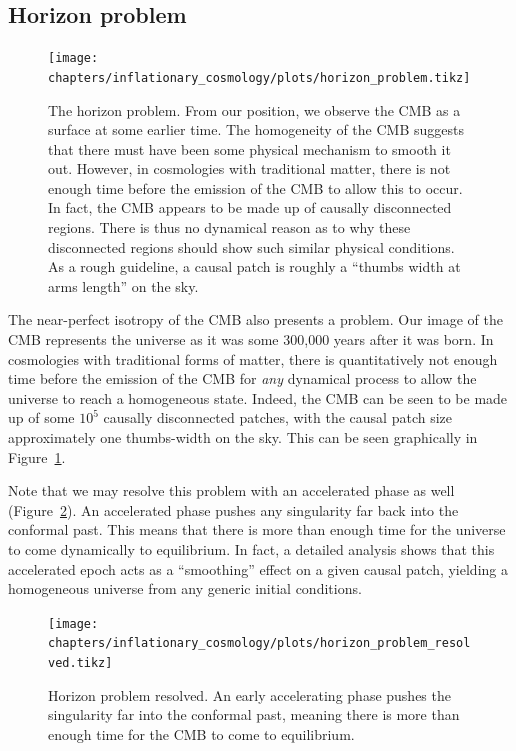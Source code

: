 \subsection{Horizon problem}
\begin{figure}[tp]
  \centering
  \texttt{[image: chapters/inflationary\_cosmology/plots/horizon\_problem.tikz]}
  \caption{The horizon problem. From our position, we observe the CMB as a surface at some earlier time. The homogeneity of the CMB suggests that there must have been some physical mechanism to smooth it out. However, in cosmologies with traditional matter, there is not enough time before the emission of the CMB to allow this to occur. In fact, the CMB appears to be made up of causally disconnected regions. There is thus no dynamical reason as to why these disconnected regions should show such similar physical conditions. As a rough guideline, a causal patch is roughly a ``thumbs width at arms length'' on the sky.}\label{fig:cos:horizon_problem}
\end{figure}
The near-perfect isotropy of the CMB also presents a problem. Our image of the CMB represents the universe as it was some 300,000 years after it was born. In cosmologies with traditional forms of matter, there is quantitatively not enough time before the emission of the CMB for {\em any\/} dynamical process to allow the universe to reach a homogeneous state. Indeed, the CMB can be seen to be made up of some \(10^{5}\) causally disconnected patches, with the causal patch size approximately one thumbs-width on the sky. This can be seen graphically in Figure~\ref{fig:cos:horizon_problem}.

Note that we may resolve this problem with an accelerated phase as well (Figure~\ref{fig:cos:horizon_problem_resolved}). An accelerated phase pushes any singularity far back into the conformal past. This means that there is more than enough time for the universe to come dynamically to equilibrium. In fact, a detailed analysis shows that this accelerated epoch acts as a ``smoothing'' effect on a given causal patch, yielding a homogeneous universe from any generic initial conditions.


\begin{figure}[tp]
  \centering
  \texttt{[image: chapters/inflationary\_cosmology/plots/horizon\_problem\_resolved.tikz]}
  \caption{Horizon problem resolved. An early accelerating phase pushes the singularity far into the conformal past, meaning there is more than enough time for the CMB to come to equilibrium.}\label{fig:cos:horizon_problem_resolved}
\end{figure}

